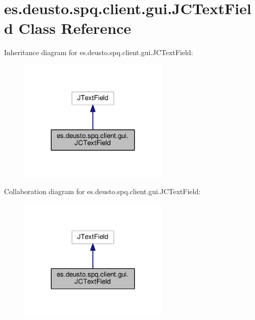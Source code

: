 \hypertarget{classes_1_1deusto_1_1spq_1_1client_1_1gui_1_1_j_c_text_field}{}\section{es.\+deusto.\+spq.\+client.\+gui.\+J\+C\+Text\+Field Class Reference}
\label{classes_1_1deusto_1_1spq_1_1client_1_1gui_1_1_j_c_text_field}


Inheritance diagram for es.\+deusto.\+spq.\+client.\+gui.\+J\+C\+Text\+Field\+:\nopagebreak
\begin{figure}[H]
\begin{center}
\leavevmode
\includegraphics[width=203pt]{classes_1_1deusto_1_1spq_1_1client_1_1gui_1_1_j_c_text_field__inherit__graph}
\end{center}
\end{figure}


Collaboration diagram for es.\+deusto.\+spq.\+client.\+gui.\+J\+C\+Text\+Field\+:\nopagebreak
\begin{figure}[H]
\begin{center}
\leavevmode
\includegraphics[width=203pt]{classes_1_1deusto_1_1spq_1_1client_1_1gui_1_1_j_c_text_field__coll__graph}
\end{center}
\end{figure}
